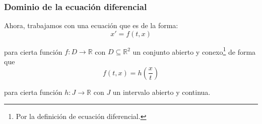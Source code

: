 \subsubsection{Dominio de la ecuación diferencial}
Ahora, trabajamos con una ecuación que es de la forma:
\begin{equation*}
    x' = f(t,x)
\end{equation*}

para cierta función $f:D\rightarrow\mathbb{R}$ con $D\subseteq \mathbb{R}^2$ un conjunto abierto y conexo\footnote{Por la definición de ecuación diferencial.} de forma que
\begin{equation*}
    f(t,x) = h\left(\dfrac{x}{t}\right)
\end{equation*}

para cierta función $h:J\rightarrow\mathbb{R}$ con $J$ un intervalo abierto y continua.\\

